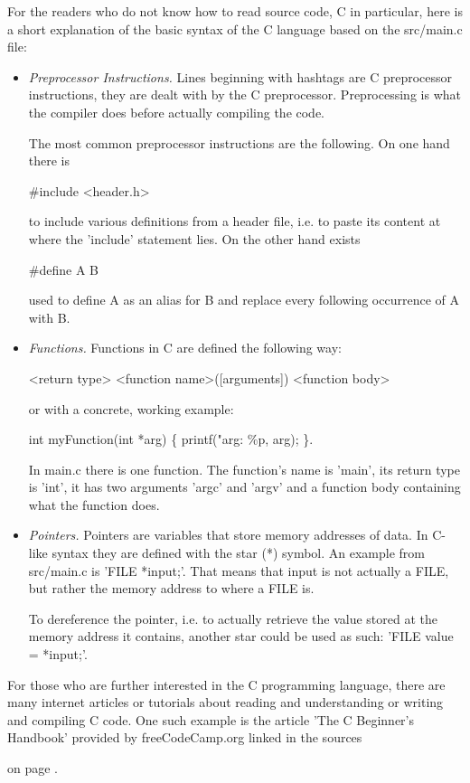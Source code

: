 \documentclass[12pt,a4paper]{report}
\newcommand{\cte}[1] {
    \cite{#1}
}
\newcommand{\expr}[1] {
    \begin{center}
        #1
    \end{center}
}
\begin{document}
For the readers who do not know how to read source code, C in particular, here is a short
explanation of the basic syntax of the C language based on the src/main.c file:
\begin{itemize}
    \item \emph{Preprocessor Instructions.} Lines beginning with hashtags are
        C preprocessor instructions, they are dealt with by the C preprocessor.
        Preprocessing is what the compiler does before actually compiling the
        code.

        The most common preprocessor instructions are the following.
        On one hand there is \expr{\#include <header.h>}
        to include various definitions from a header file, i.e. to paste
        its content at where the 'include' statement lies.
        On the other hand exists \expr{\#define A B} used to
        define A as an alias for B and replace every following occurrence of A
        with B.

    \item \emph{Functions.} Functions in C are defined the following way:
        \expr{<return type> <function name>([arguments]) { <function body> }}
        or with a concrete, working example:
        \expr{int myFunction(int *arg) \{ printf("arg: \%p, arg); \}.}
        In main.c there is one function. The function's name is 'main', its
        return type is 'int', it has two arguments 'argc' and 'argv' and a
        function body containing what the function does.

    \item \emph{Pointers.} Pointers are variables that store memory addresses
        of data. In C-like syntax they are defined with the star (*) symbol.
        An example from src/main.c is 'FILE *input;'. That means that input is not
        actually a FILE, but rather the memory address to where a FILE is.

        To dereference the pointer, i.e. to actually retrieve the value stored
        at the memory address it contains, another star could be used as such:
        'FILE value = *input;'.
\end{itemize}

For those who are further interested in the C programming language, there are
many internet articles or tutorials about reading and understanding or
writing and compiling C code. One such example is the article 'The C Beginner's
Handbook' provided by freeCodeCamp.org linked in the sources\cte{freeCodeCamp}
on page \pageref{bibliography}.
\end{document}
